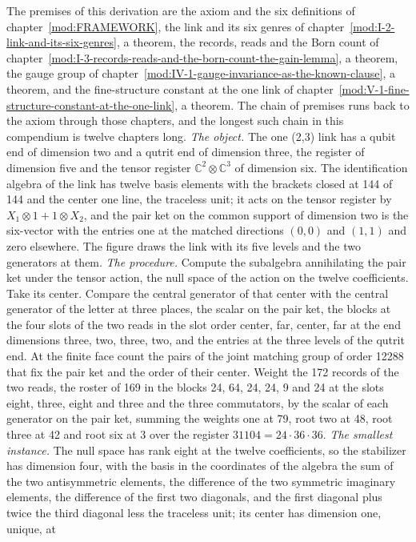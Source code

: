 \begin{chproof}
The premises of this derivation are the axiom and the six definitions of chapter~\ref{mod:FRAMEWORK}, the link and its six genres of chapter~\ref{mod:I-2-link-and-its-six-genres}, a theorem, the records, reads and the Born count of chapter~\ref{mod:I-3-records-reads-and-the-born-count-the-gain-lemma}, a theorem, the gauge group of chapter~\ref{mod:IV-1-gauge-invariance-as-the-known-clause}, a theorem, and the fine-structure constant at the one link of chapter~\ref{mod:V-1-fine-structure-constant-at-the-one-link}, a theorem. The chain of premises runs back to the axiom through those chapters, and the longest such chain in this compendium is twelve chapters long.
\textit{The object.} The one (2,3) link has a qubit end of dimension two and a qutrit end of dimension three, the register of dimension five and the tensor register $\mathbb{C}^{2}\otimes\mathbb{C}^{3}$ of dimension six. The identification algebra of the link has twelve basis elements with the brackets closed at 144 of 144 and the center one line, the traceless unit; it acts on the tensor register by $X_{1}\otimes 1 + 1\otimes X_{2}$, and the pair ket on the common support of dimension two is the six-vector with the entries one at the matched directions $(0,0)$ and $(1,1)$ and zero elsewhere. The figure draws the link with its five levels and the two generators at them.
\textit{The procedure.} Compute the subalgebra annihilating the pair ket under the tensor action, the null space of the action on the twelve coefficients. Take its center. Compare the central generator of that center with the central generator of the letter at three places, the scalar on the pair ket, the blocks at the four slots of the two reads in the slot order center, far, center, far at the end dimensions three, two, three, two, and the entries at the three levels of the qutrit end. At the finite face count the pairs of the joint matching group of order 12288 that fix the pair ket and the order of their center. Weight the 172 records of the two reads, the roster of 169 in the blocks 24, 64, 24, 24, 9 and 24 at the slots eight, three, eight and three and the three commutators, by the scalar of each generator on the pair ket, summing the weights one at 79, root two at 48, root three at 42 and root six at 3 over the register $31104 = 24\cdot 36\cdot 36$.
\textit{The smallest instance.} The null space has rank eight at the twelve coefficients, so the stabilizer has dimension four, with the basis in the coordinates of the algebra the sum of the two antisymmetric elements, the difference of the two symmetric imaginary elements, the difference of the first two diagonals, and the first diagonal plus twice the third diagonal less the traceless unit; its center has dimension one, unique, at

\end{chproof}
